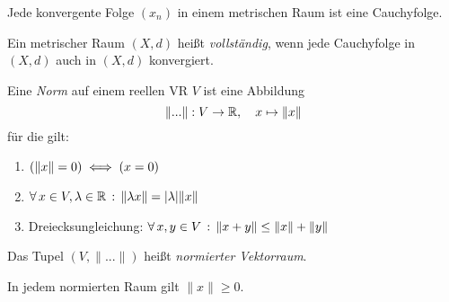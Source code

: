\documentclass{cheat-sheet}
\begin{document}
\begin{satz}
Jede konvergente Folge $(x_n)$ in einem metrischen Raum ist eine Cauchyfolge.
\end{satz}

\begin{defn}
Ein metrischer Raum $(X, d)$ heißt \emph{vollständig}, wenn jede Cauchyfolge in $(X, d)$ auch in $(X, d)$ konvergiert.
\end{defn}


\begin{defn}
Eine \emph{Norm} auf einem reellen VR $V$ ist eine Abbildung
\[ \|...\| : V \to \mathbb{R},\quad x \mapsto \| x \| \]
für die gilt:
\begin{enumerate}
  \item $(\lVert x\rVert = 0) \iff (x = 0)$
  \item $\forall \, {x \in V, \lambda \in \mathbb{R}} \,:\, \lVert\lambda x\rVert = \lvert\lambda\rvert \lVert x\rVert$
  \item Dreiecksungleichung: $\forall \, {x, y \in V} \,:\, \lVert x + y\rVert \le \lVert x\rVert + \lVert y\rVert$
\end{enumerate}
Das Tupel $(V, \|...\|)$ heißt \emph{normierter Vektorraum}.
\end{defn}

\begin{bem}
In jedem normierten Raum gilt $\| x \| \ge 0$.
\end{bem}
\end{document}
